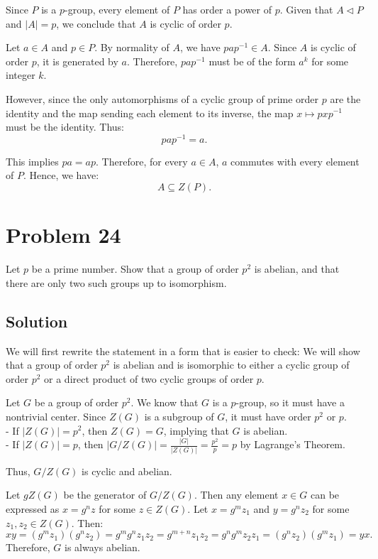 \documentclass[12pt]{article}
\begin{document}
Since \( P \) is a \( p \)-group, every element of \( P \) has order a power of \( p \). Given that \( A \triangleleft P \) and \( |A| = p \), we conclude that \( A \) is cyclic of order \( p \).

Let \( a \in A \) and \( p \in P \). By normality of \( A \), we have \( p a p^{-1} \in A \). Since \( A \) is cyclic of order \( p \), it is generated by \( a \). Therefore, \( p a p^{-1} \) must be of the form \( a^k \) for some integer \( k \). 

However, since the only automorphisms of a cyclic group of prime order \( p \) are the identity and the map sending each element to its inverse, the map \( x \mapsto p x p^{-1} \) must be the identity. Thus:
\[
p a p^{-1} = a.
\]

This implies \( p a = a p \). Therefore, for every \( a \in A \), \( a \) commutes with every element of \( P \). Hence, we have:
\[
A \subseteq Z(P).
\]
\section*{Problem 24}
Let \( p \) be a prime number. Show that a group of order \( p^2 \) is abelian, and that there are only two such groups up to isomorphism.

\subsection*{Solution}
We will first rewrite the statement in a form that is easier to check: We will show that a group of order \( p^2 \) is abelian and is isomorphic to either a cyclic group of order \( p^2 \) or a direct product of two cyclic groups of order \( p \).

Let \( G \) be a group of order \( p^2 \). We know that \( G \) is a \( p \)-group, so it must have a nontrivial center. Since \( Z(G) \) is a subgroup of \( G \), it must have order \( p^2 \) or \( p \). 
\\
- If \( |Z(G)| = p^2 \), then \( Z(G) = G \), implying that \( G \) is abelian.\\
- If \( |Z(G)| = p \), then \( |G / Z(G)| = \frac{|G|}{|Z(G)|} = \frac{p^2}{p} = p \) by Lagrange’s Theorem. 

Thus, \( G / Z(G) \) is cyclic and abelian.

Let \( gZ(G) \) be the generator of \( G / Z(G) \). Then any element \( x \in G \) can be expressed as \( x = g^n z \) for some \( z \in Z(G) \). Let \( x = g^m z_1 \) and \( y = g^n z_2 \) for some \( z_1, z_2 \in Z(G) \). Then:
\[
xy = (g^m z_1)(g^n z_2) = g^m g^n z_1 z_2 = g^{m+n} z_1 z_2 = g^n g^m z_2 z_1 = (g^n z_2)(g^m z_1) = yx.
\]
Therefore, \( G \) is always abelian.
\end{document}
